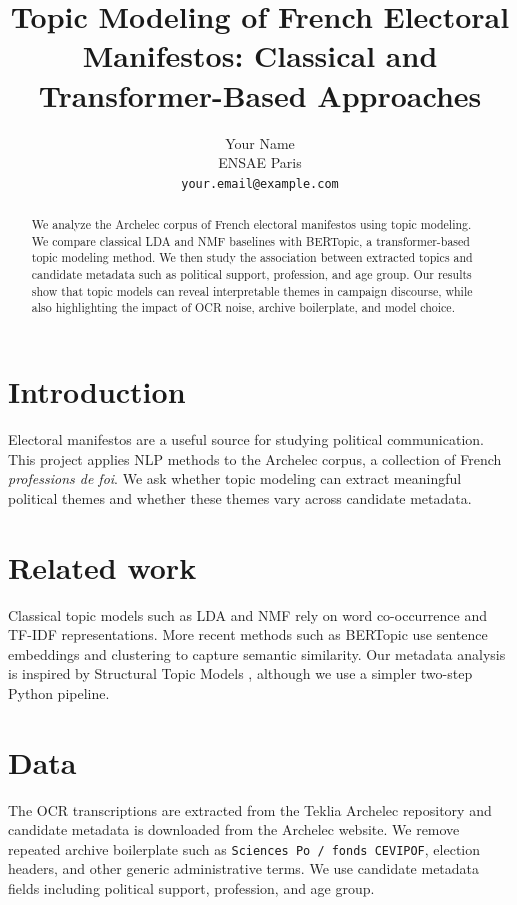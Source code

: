 \documentclass{article}
\title{Topic Modeling of French Electoral Manifestos: Classical and Transformer-Based Approaches}
\author{Your Name\\ENSAE Paris\\\texttt{your.email@example.com}}
\begin{document}
\maketitle

\begin{abstract}
We analyze the Archelec corpus of French electoral manifestos using topic modeling. We compare classical LDA and NMF baselines with BERTopic, a transformer-based topic modeling method. We then study the association between extracted topics and candidate metadata such as political support, profession, and age group. Our results show that topic models can reveal interpretable themes in campaign discourse, while also highlighting the impact of OCR noise, archive boilerplate, and model choice.
\end{abstract}

\section{Introduction}
Electoral manifestos are a useful source for studying political communication. This project applies NLP methods to the Archelec corpus, a collection of French \textit{professions de foi}. We ask whether topic modeling can extract meaningful political themes and whether these themes vary across candidate metadata.

\section{Related work}
Classical topic models such as LDA \citep{blei2003lda} and NMF rely on word co-occurrence and TF-IDF representations. More recent methods such as BERTopic \citep{grootendorst2022bertopic} use sentence embeddings \citep{reimers2019sentencebert} and clustering to capture semantic similarity. Our metadata analysis is inspired by Structural Topic Models \citep{roberts2014stm}, although we use a simpler two-step Python pipeline.

\section{Data}
The OCR transcriptions are extracted from the Teklia Archelec repository and candidate metadata is downloaded from the Archelec website. We remove repeated archive boilerplate such as \texttt{Sciences Po / fonds CEVIPOF}, election headers, and other generic administrative terms. We use candidate metadata fields including political support, profession, and age group.
\end{document}
